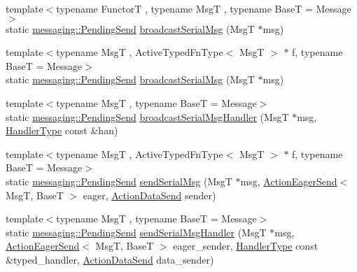 \begin{DoxyCompactItemize}
{\footnotesize template$<$typename FunctorT , typename MsgT , typename BaseT  = Message$>$ }\\static \hyperlink{structvt_1_1messaging_1_1_pending_send}{messaging\+::\+Pending\+Send} \hyperlink{structvt_1_1serialization_1_1_serialized_messenger_a2e905fb9eca8c4352522f998f94f4de8}{broadcast\+Serial\+Msg} (MsgT $\ast$msg)
\item 
{\footnotesize template$<$typename MsgT , Active\+Typed\+Fn\+Type$<$ Msg\+T $>$ $\ast$ f, typename BaseT  = Message$>$ }\\static \hyperlink{structvt_1_1messaging_1_1_pending_send}{messaging\+::\+Pending\+Send} \hyperlink{structvt_1_1serialization_1_1_serialized_messenger_a2a1f3beaf021915bcf3bcaa224895cbb}{broadcast\+Serial\+Msg} (MsgT $\ast$msg)
\item 
{\footnotesize template$<$typename MsgT , typename BaseT  = Message$>$ }\\static \hyperlink{structvt_1_1messaging_1_1_pending_send}{messaging\+::\+Pending\+Send} \hyperlink{structvt_1_1serialization_1_1_serialized_messenger_a209c944b63b053317a99b51eb3269d8a}{broadcast\+Serial\+Msg\+Handler} (MsgT $\ast$msg, \hyperlink{namespacevt_af64846b57dfcaf104da3ef6967917573}{Handler\+Type} const \&han)
\item 
{\footnotesize template$<$typename MsgT , Active\+Typed\+Fn\+Type$<$ Msg\+T $>$ $\ast$ f, typename BaseT  = Message$>$ }\\static \hyperlink{structvt_1_1messaging_1_1_pending_send}{messaging\+::\+Pending\+Send} \hyperlink{structvt_1_1serialization_1_1_serialized_messenger_a5e8450f7c97e407703b61dd1ed047eb8}{send\+Serial\+Msg} (MsgT $\ast$msg, \hyperlink{namespacevt_1_1serialization_a009aa1de8d42a3c97643b947fcc6f0b6}{Action\+Eager\+Send}$<$ MsgT, BaseT $>$ eager, \hyperlink{namespacevt_1_1serialization_afffcac0da80b78e77ef8043dba4e814f}{Action\+Data\+Send} sender)
\item 
{\footnotesize template$<$typename MsgT , typename BaseT  = Message$>$ }\\static \hyperlink{structvt_1_1messaging_1_1_pending_send}{messaging\+::\+Pending\+Send} \hyperlink{structvt_1_1serialization_1_1_serialized_messenger_ad42536151cbfb8cd42e9c8431c3d58b7}{send\+Serial\+Msg\+Handler} (MsgT $\ast$msg, \hyperlink{namespacevt_1_1serialization_a009aa1de8d42a3c97643b947fcc6f0b6}{Action\+Eager\+Send}$<$ MsgT, BaseT $>$ eager\+\_\+sender, \hyperlink{namespacevt_af64846b57dfcaf104da3ef6967917573}{Handler\+Type} const \&typed\+\_\+handler, \hyperlink{namespacevt_1_1serialization_afffcac0da80b78e77ef8043dba4e814f}{Action\+Data\+Send} data\+\_\+sender)
\end{DoxyCompactItemize}



